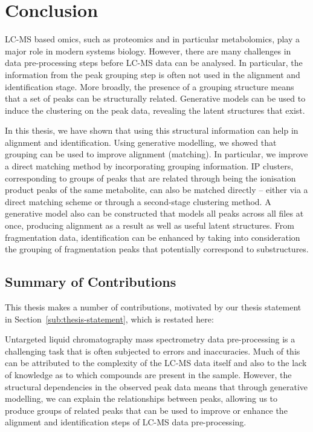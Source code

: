 \chapter{Conclusion}
\label{c:conclusion}

LC-MS based omics, such as proteomics and in particular metabolomics, play a major role in modern systems biology. However, there are many challenges in data pre-processing steps before LC-MS data can be analysed. In particular, the information from the peak grouping step is often not used in the alignment and identification stage. More broadly, the presence of a grouping structure means that a set of peaks can be structurally related. Generative models can be used to induce the clustering on the peak data, revealing the latent structures that exist. 

In this thesis, we have shown that using this structural information can help in alignment and identification. Using generative modelling, we showed that grouping can be used to improve alignment (matching). In particular, we improve a direct matching method by incorporating grouping information. IP clusters, corresponding to groups of peaks that are related through being the ionisation product peaks of the same metabolite, can also be matched directly -- either via a direct matching scheme or through a second-stage clustering method. A generative model also can be constructed that models all peaks across all files at once, producing alignment as a result as well as useful latent structures. From fragmentation data, identification can be enhanced by taking into consideration the grouping of fragmentation peaks that potentially correspond to substructures.

\section{Summary of Contributions}

This thesis makes a number of contributions, motivated by our thesis statement in Section~\ref{sub:thesis-statement}, which is restated here:

Untargeted liquid chromatography mass spectrometry data pre-processing is a challenging task that is often subjected to errors and inaccuracies. Much of this can be attributed to the complexity of the LC-MS data itself and also to the lack of knowledge as to which compounds are present in the sample. However, the structural dependencies in the observed peak data means that through generative modelling, we can explain the relationships between peaks, allowing us to produce groups of related peaks that can be used to improve or enhance the alignment and identification steps of LC-MS data pre-processing.

